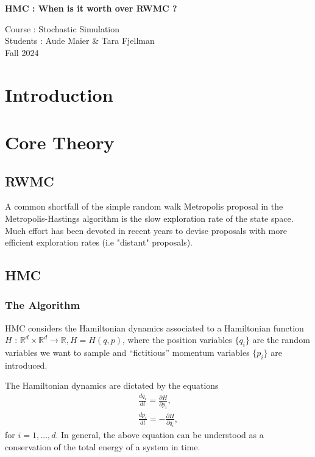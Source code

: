 \documentclass[a4paper, 12pt,oneside]{article}
\begin{document}
 
	\begin{center}
	    \Large
	    \textbf{HMC : When is it worth over RWMC ?} 
	    \vspace{0.4cm}
	    \large

		Course : Stochastic Simulation \\
	    Students : Aude Maier \& Tara Fjellman \\
	    \small{Fall 2024}
	\end{center}

	\section{Introduction}
	\section{Core Theory}

		\subsection{RWMC}
		A common shortfall of the simple random walk Metropolis proposal in the Metropolis-Hastings algorithm is the slow exploration rate of the state space. Much effort has been devoted in recent years to devise proposals with more efficient exploration rates (i.e "distant" proposals).
		\subsection{HMC}
			\subsubsection{The Algorithm}
			HMC considers the Hamiltonian dynamics associated to a Hamiltonian function $H$ : $\mathbb{R}^d \times \mathbb{R}^d \rightarrow \mathbb{R}, H=H(q, p)$, where the position variables $\{q_i\}$ are the random variables we want to sample and ``fictitious'' momentum variables $\{p_i\}$ are introduced. 
			
			The Hamiltonian dynamics are dictated by the equations
			\begin{gather}
			\frac{d q_i}{d t} =\frac{\partial H}{\partial p_i}, \\
			\frac{d p_i}{d t} =-\frac{\partial H}{\partial q_i},
			\end{gather}
			for $i=1, \ldots, d$. In general, the above equation can be understood as a conservation of the total energy of a system in time.
			
\end{document}
